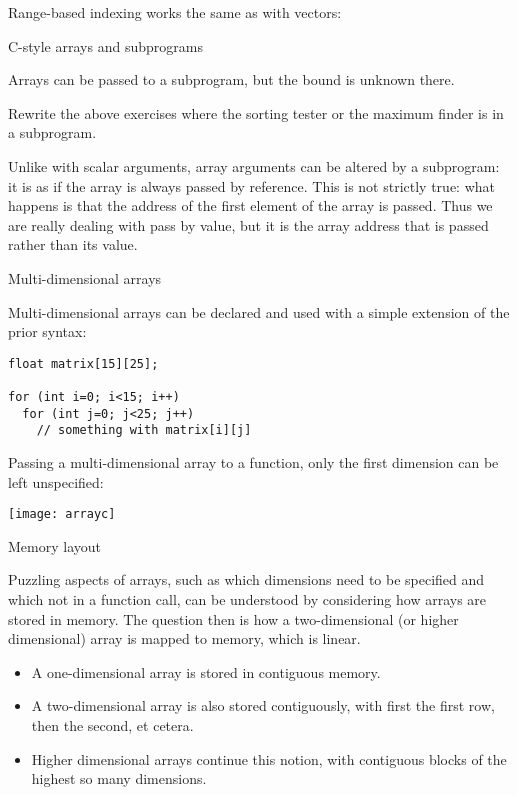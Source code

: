 Range-based indexing works the same as with vectors:
%

 {C-style arrays and subprograms}

Arrays can be passed to a subprogram, but the bound is unknown there.
%
%
\begin{exercise}
  Rewrite the above exercises where the sorting tester or the maximum
  finder is in a subprogram.
\end{exercise}

Unlike with scalar arguments, array arguments can be altered by a
subprogram: it is as if the array is always passed by reference. This is
not strictly true: what happens is that the address of the first
element of the array is passed. Thus we are really dealing with pass
by value, but it is the array address that is passed rather than its value.

 {Multi-dimensional arrays}

Multi-dimensional arrays can be declared and used with a simple extension of
the prior syntax:
\begin{lstlisting}
float matrix[15][25];

for (int i=0; i<15; i++)
  for (int j=0; j<25; j++)
    // something with matrix[i][j]
\end{lstlisting}

Passing a multi-dimensional array to a function, only the first
dimension can be left unspecified:
%

\texttt{[image: arrayc]}

 {Memory layout}

Puzzling aspects of arrays, such as which dimensions need to be
specified and which not in a function call, can be understood by
considering how arrays are stored in memory.
The question then is how a two-dimensional (or higher dimensional)
array is mapped to memory, which is linear.
\begin{itemize}
\item A one-dimensional array is stored in contiguous memory.
\item A two-dimensional array is also stored contiguously, with first
  the first row, then the second, et cetera.
\item Higher dimensional arrays continue this notion, with contiguous
  blocks of the highest so many dimensions.
\end{itemize}

